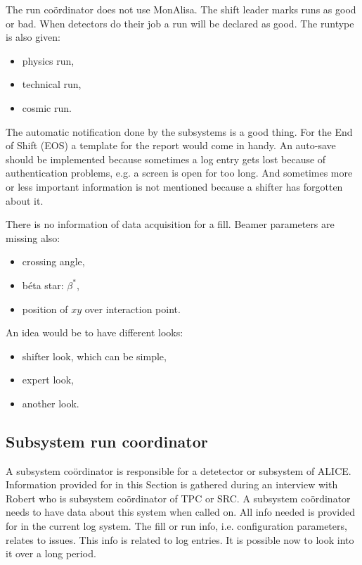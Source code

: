The run co\"ordinator does not use MonAlisa. The shift leader marks runs as good or bad. When detectors do their job a run will be declared as good. The runtype is also given:
\begin{itemize}
  \item physics run,
  \item technical run,
  \item cosmic run.
\end{itemize}
The automatic notification done by the subsystems is a good thing. For the End of Shift (EOS) a template for the report would come in handy. An auto-save should be implemented because sometimes a log entry gets lost because of authentication problems, e.g. a screen is open for too long. And sometimes more or less important information is not mentioned because a shifter has forgotten about it.

There is no information of data acquisition for a fill. Beamer parameters are missing also:
\begin{itemize}
  \item crossing angle,
  \item b\'eta star: $\beta^*$,
  \item position of $xy$ over interaction point.
\end{itemize}

An idea would be to have different looks:
\begin{itemize}
  \item shifter look, which can be simple,
  \item expert look,
  \item another look.
\end{itemize}





\subsection{Subsystem run coordinator}
A subsystem co\"ordinator is responsible for a detetector or subsystem of ALICE. Information provided for in this Section is gathered during an interview with Robert who is subsystem co\"ordinator of TPC or SRC. A subsystem co\"ordinator needs to have data about this system when called on. All info needed is provided for in the current log system. The fill or run info, i.e. configuration parameters, relates to issues. This info is related to log entries. It is possible now to look into it over a long period.

